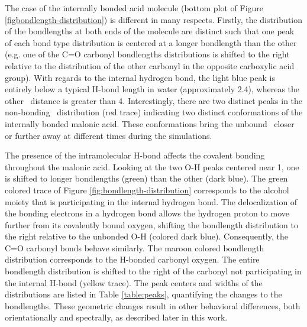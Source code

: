 The case of the internally bonded acid molecule (bottom plot of Figure \ref{figbondlength-distribution}) is different in many respects. Firstly, the distribution of the bondlengths at both ends of the molecule are distinct such that one peak of each bond type distribution is centered at a longer bondlength than the other (e.g. one of the C=O carbonyl bondlengths distributions is shifted to the right relative to the distribution of the other carbonyl in the opposite carboxylic acid group). With regards to the internal hydrogen bond, the light blue peak is entirely below a typical H-bond length in water (approximately 2.4\angs), whereas the other \ocarb~distance is greater than 4\angs. Interestingly, there are two distinct peaks in the non-bonding \ocarb~distribution (red trace) indicating two distinct conformations of the internally bonded malonic acid. These conformations bring the unbound \ocarb~closer or further away at different times during the simulations.

The presence of the intramolecular H-bond affects the covalent bonding throughout the malonic acid. Looking at the two O-H peaks centered near 1\angs, one is shifted to longer bondlengths (green) than the other (dark blue). The green colored trace of Figure \ref{fig:bondlength-distribution} corresponds to the alcohol moiety that is participating in the internal hydrogen bond. The delocalization of the bonding electrons in a hydrogen bond allows the hydrogen proton to move further from its covalently bound oxygen, shifting the bondlength distribution to the right relative to the unbonded O-H (colored dark blue). Consequently, the C=O carbonyl bonds behave similarly. The maroon colored bondlength distribution corresponds to the H-bonded carbonyl oxygen. The entire bondlength distribution is shifted to the right of the carbonyl not participating in the internal H-bond (yellow trace). The peak centers and widths of the distributions are listed in Table \ref{table:peaks}, quantifying the changes to the bondlengths. These geometric changes result in other behavioral differences, both orientationally and spectrally, as described later in this work.

